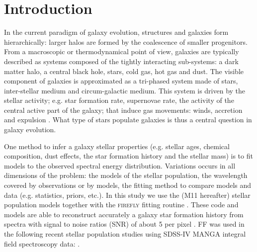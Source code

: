 \documentclass[onecolumn]{aa}
\begin{document}
\section{Introduction}
\label{sec:introduction}

In the current paradigm of galaxy evolution, structures and galaxies form hierarchically: larger halos are formed by the coalescence of smaller progenitors. 
From a macroscopic or thermodynamical point of view, galaxies are typically described as systems composed of the tightly interacting sub-systems: a dark matter halo, a central black hole, stars, cold gas, hot gas and dust. 
The visible component of galaxies is approximated as a tri-phased system made of stars, inter-stellar medium and circum-galactic medium. This system is driven by the stellar activity; e.g. star formation rate, supernovae rate, the activity of the central active part of the galaxy; that induce gas movements: winds, accretion and expulsion \citep{mo2010book}. 
What type of stars populate galaxies is thus a central question in galaxy evolution. 

One method to infer a galaxy stellar properties (e.g. stellar ages, chemical composition, dust effects, the star formation history and the stellar mass) is to fit models to the observed spectral energy distribution. 
Variations occurs in all dimensions of the problem: the models of the stellar population, the wavelength covered by observations or by models, the fitting method to compare models and data (e.g. statistics, priors, etc.). 
In this study we use the \citet{Maraston_2011} (M11 hereafter) stellar population models together with the \textsc{firefly} fitting routine \citep[hereafter FF][]{Wilkinson_2015,Goddard2017MNRAS.465..688G,Goddard2017MNRAS.466.4731G,firefly2017MNRAS}.
These code and models are able to reconstruct accurately a galaxy star formation history from spectra with signal to noise ratios (SNR) of about 5 per pixel \citep[see, ][and Sec. \ref{subsec:firefly:performances}]{firefly2017MNRAS}. %
FF was used in the following recent stellar population studies using SDSS-IV MANGA integral field spectroscopy data:  \citet{Wilkinson_2015,Goddard2017MNRAS.465..688G,Goddard2017MNRAS.466.4731G,2018MNRAS.474.1143L,2018MNRAS.476.3883L,2018MNRAS.477.3954P}.
\end{document}
